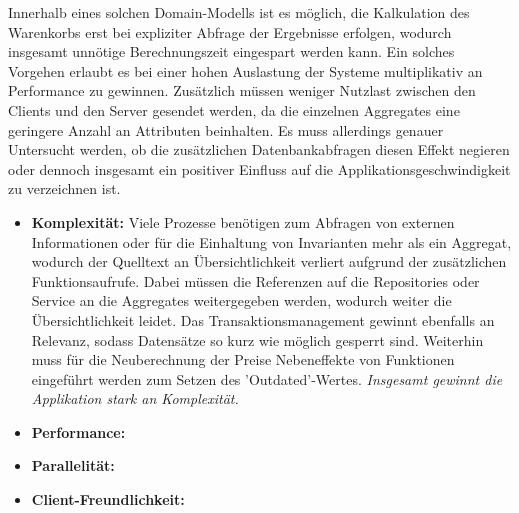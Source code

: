 Innerhalb eines solchen Domain-Modells ist es möglich, die Kalkulation des Warenkorbs erst bei expliziter Abfrage der Ergebnisse erfolgen, wodurch insgesamt unnötige Berechnungszeit eingespart werden kann. Ein solches Vorgehen erlaubt es bei einer hohen Auslastung der Systeme multiplikativ an Performance zu gewinnen. Zusätzlich müssen weniger Nutzlast zwischen den Clients und den Server gesendet werden, da die einzelnen Aggregates eine geringere Anzahl an Attributen beinhalten. Es muss allerdings genauer Untersucht werden, ob die zusätzlichen Datenbankabfragen diesen Effekt negieren oder dennoch insgesamt ein positiver Einfluss auf die Applikationsgeschwindigkeit zu verzeichnen ist. 

\begin{itemize}[noitemsep,nolistsep,topsep=-2pt]
	\item \textbf{Komplexität: } {Viele Prozesse benötigen zum Abfragen von externen Informationen oder für die Einhaltung von Invarianten mehr als ein Aggregat, wodurch der Quelltext an Übersichtlichkeit verliert aufgrund der zusätzlichen Funktionsaufrufe. Dabei müssen die Referenzen auf die Repositories oder Service an die Aggregates weitergegeben werden, wodurch weiter die Übersichtlichkeit leidet. Das Transaktionsmanagement gewinnt ebenfalls an Relevanz, sodass Datensätze so kurz wie möglich gesperrt sind. Weiterhin muss für die Neuberechnung der Preise Nebeneffekte von Funktionen eingeführt werden zum Setzen des 'Outdated'-Wertes. \emph{Insgesamt gewinnt die Applikation stark an Komplexität.}}
	\item \textbf{Performance: } {}
	\item \textbf{Parallelität: } {}
	\item \textbf{Client-Freundlichkeit: } {}
\end{itemize}

